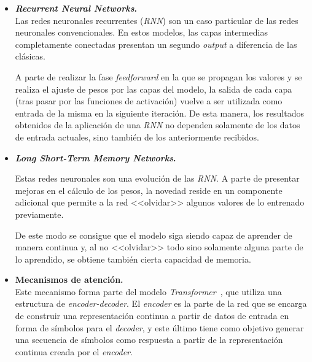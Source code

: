 \begin{itemize}
    \item \textbf{\textit{Recurrent Neural Networks}.}\\
    Las redes neuronales recurrentes (\textit{RNN}) son un caso particular de las redes neuronales convencionales. En estos modelos, las capas intermedias completamente conectadas presentan un segundo \textit{output} a diferencia de las clásicas. 
    
    A parte de realizar la fase \textit{feedforward} en la que se propagan los valores y se realiza el ajuste de pesos por las capas del modelo, la salida de cada capa (tras pasar por las funciones de activación) vuelve a ser utilizada como entrada de la misma en la siguiente iteración. De esta manera, los resultados obtenidos de la aplicación de una \textit{RNN} no dependen solamente de los datos de entrada actuales, sino también de los anteriormente recibidos. 


    \item \textbf{\textit{Long Short-Term Memory Networks}.}\
  


    Estas redes neuronales son una evolución de las \textit{RNN}. A parte de presentar mejoras en el cálculo de los pesos, la novedad reside en un componente adicional que permite a la red <<olvidar>> algunos valores de lo entrenado previamente.
    
    De este modo se consigue que el modelo siga siendo capaz de aprender de manera continua y, al no <<olvidar>> todo sino solamente alguna parte de lo aprendido, se obtiene también cierta capacidad de memoria.

    \item \textbf{Mecanismos de atención.}\\    
    Este mecanismo forma parte del modelo \textit{Transformer}~\cite{vaswani2017attention}, que utiliza una estructura de \textit{encoder-decoder}. El \textit{encoder} es la parte de la red que se encarga de construir una representación continua a partir de datos de entrada en forma de símbolos para el \textit{decoder}, y este último tiene como objetivo generar una secuencia de símbolos como respuesta a partir de la representación continua creada por el \textit{encoder}.


\end{itemize}
